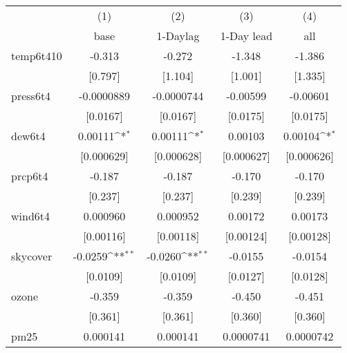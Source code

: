 {
\def\sym#1{\ifmmode^{#1}\else\(^{#1}\)\fi}
\begin{tabular}{l*{4}{c}}
\hline\hline
            &\multicolumn{1}{c}{(1)}&\multicolumn{1}{c}{(2)}&\multicolumn{1}{c}{(3)}&\multicolumn{1}{c}{(4)}\\
            &\multicolumn{1}{c}{base}&\multicolumn{1}{c}{1-Daylag}&\multicolumn{1}{c}{1-Day lead}&\multicolumn{1}{c}{all}\\
\hline
temp6t410   &      -0.313         &      -0.272         &      -1.348         &      -1.386         \\
            &     [0.797]         &     [1.104]         &     [1.001]         &     [1.335]         \\
[1em]
press6t4    &  -0.0000889         &  -0.0000744         &    -0.00599         &    -0.00601         \\
            &    [0.0167]         &    [0.0167]         &    [0.0175]         &    [0.0175]         \\
[1em]
dew6t4      &     0.00111\sym{*}  &     0.00111\sym{*}  &     0.00103         &     0.00104\sym{*}  \\
            &  [0.000629]         &  [0.000628]         &  [0.000627]         &  [0.000626]         \\
[1em]
prcp6t4     &      -0.187         &      -0.187         &      -0.170         &      -0.170         \\
            &     [0.237]         &     [0.237]         &     [0.239]         &     [0.239]         \\
[1em]
wind6t4     &    0.000960         &    0.000952         &     0.00172         &     0.00173         \\
            &   [0.00116]         &   [0.00118]         &   [0.00124]         &   [0.00128]         \\
[1em]
skycover    &     -0.0259\sym{**} &     -0.0260\sym{**} &     -0.0155         &     -0.0154         \\
            &    [0.0109]         &    [0.0109]         &    [0.0127]         &    [0.0128]         \\
[1em]
ozone       &      -0.359         &      -0.359         &      -0.450         &      -0.451         \\
            &     [0.361]         &     [0.361]         &     [0.360]         &     [0.360]         \\
[1em]
pm25        &    0.000141         &    0.000141         &   0.0000741         &   0.0000742         \\

\end{tabular}}
